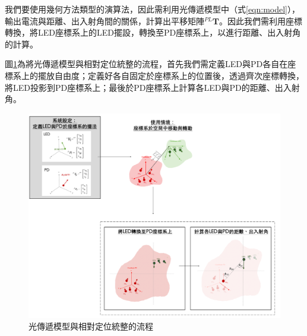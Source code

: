     我們要使用幾何方法類型的演算法，因此需利用光傳遞模型中（式\ref{eqn:model}），輸出電流與距離、出入射角間的關係，計算出平移矩陣$^{PL}\boldsymbol{T}$。因此我們需利用座標轉換，將LED座標系上的LED擺設，轉換至PD座標系上，以進行距離、出入射角的計算。

    圖\ref{pic:model_transform_flow}為將光傳遞模型與相對定位統整的流程，首先我們需定義LED與PD各自在座標系上的擺放自由度；定義好各自固定於座標系上的位置後，透過齊次座標轉換，將LED投影到PD座標系上；最後於PD座標系上計算各LED與PD的距離、出入射角。

    \begin{figure}[ht]
        \centering
        \includegraphics[width=15cm]{ch2pic/model_transform_flow.png}
        \caption{光傳遞模型與相對定位統整的流程}
        \label{pic:model_transform_flow}
    \end{figure}
    
